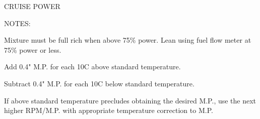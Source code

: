 \begin{sidewaysfigure}[htb]
\begin{center}
\begin{perfhdr}CRUISE POWER
\end{perfhdr}
\vspace{.2in}
\begin{minipage}{8.56in}
\begin{minipage}{5in}
NOTES:
\begin{enumerate*}
\item Mixture must be full rich when above 75\% power. Lean using fuel flow meter at 75\% power or less.
\item Add 0.4" M.P. for each 10\textdegree C above standard temperature.  
\item Subtract 0.4" M.P. for each 10\textdegree C below standard temperature.
\item If above standard temperature precludes obtaining the desired M.P., use the next higher RPM/M.P. with appropriate temperature correction to M.P.
\end{enumerate*}


\end{minipage}
\end{minipage}
\end{center}
\end{sidewaysfigure}
